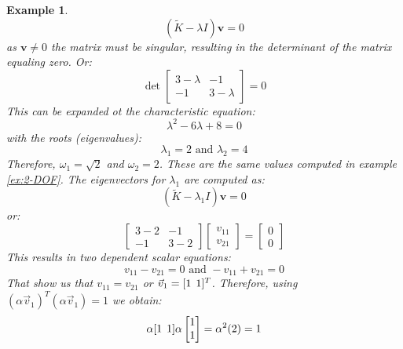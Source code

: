 \documentclass[12pt,letter]{article}
\newtheorem{ex}{Example}
\numberwithin{ex}{section} %
\newenvironment{example}{\begin{mdframed}[middlelinewidth=0.5mm]\begin{ex}\normalfont}{\end{ex}\end{mdframed}}
\numberwithin{re}{section} %
\begin{document}
\begin{example}
\begin{equation}
(\widetilde{K} - \lambda I)\textbf{v} =  0
\end{equation}
as $\textbf{v} \neq 0$ the matrix must be singular, resulting in the determinant of the matrix equaling zero. Or:
\begin{equation}
\det \begin{bmatrix} 3-\lambda & -1 \\    -1  & 3-\lambda \end{bmatrix}  =  0
\end{equation}
This can be expanded ot the characteristic equation:
\begin{equation}
\lambda^2 -6\lambda + 8  =  0
\end{equation}
with the roots (eigenvalues):
\begin{equation}
\lambda_1 = 2\text{ and } \lambda_2 = 4
\end{equation}
Therefore, $\omega_1=\sqrt{2}$ and $\omega_2=2$. These are the same values computed in example \ref{ex:2-DOF}. The eigenvectors for $\lambda_1$ are computed as:
\begin{equation}
(\widetilde{K} - \lambda_1 I)\textbf{v} =  0
\end{equation}
or:
\begin{equation}
\begin{bmatrix} 3-2 & -1 \\    -1  & 3-2 \end{bmatrix} \begin{bmatrix} v_{11} \\ v_{21}  \end{bmatrix} =  \begin{bmatrix} 0 \\ 0  \end{bmatrix}
\end{equation}
This results in two dependent scalar equations:
\begin{equation}
v_{11} - v_{21} = 0 \text{ and } -v_{11} + v_{21} =0
\end{equation}
That show us that $v_{11} = v_{21}$ or $\vec{v}_1=[1 \hspace{1ex} 1]^T$. Therefore, using $(\alpha \vec{v}_1)^T(\alpha \vec{v}_1) = 1$ we obtain:
\begin{equation}
\alpha [1 \hspace{1ex} 1]\alpha  \begin{bmatrix} 1 \\  1 \end{bmatrix}  = \alpha^2(2) = 1

\end{equation}
\end{example}
\end{document}
